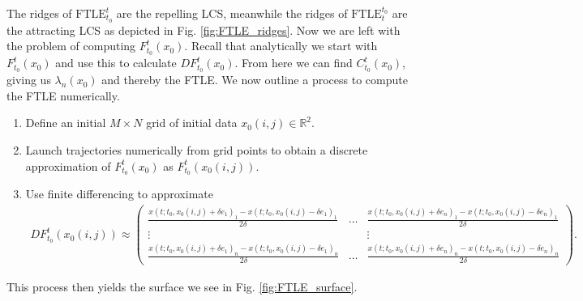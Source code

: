 The ridges of $ \textrm{FTLE} _{t_0}^{t}$ are the repelling LCS, meanwhile the ridges of $ \textrm{FTLE} _{t}^{t_0}$ are the attracting LCS as depicted in Fig. \ref{fig:FTLE_ridges}. Now we are left with the problem of computing $F_{t_0}^{t}( {x}_0)$. Recall that analytically we start with $F_{t_0}^{t}( {x}_0)$ and use this to calculate $DF_{t_0}^{t}( {x}_0)$. From here we can find $C_{t_0}^{t}( {x}_0)$, giving us $\lambda_n( {x}_0)$ and thereby the FTLE. We now outline a process to compute the FTLE numerically.
\begin{enumerate}
	\item Define an initial $M\times N$ grid of initial data $ {x}_0(i,j) \in \mathbb{R}^2$.
	\item Launch trajectories numerically from grid points to obtain a discrete approximation of $F_{t_0}^{t}( {x}_0)$ as $F_{t_0}^{t}( {x}_0(i,j))$.
	\item Use finite differencing to approximate 
		\begin{align}
			DF_{t_0}^{t}( {x}_0(i,j)) \approx
		\begin{pmatrix}
			\frac{x(t; t_0, x_0(i,j) + \delta e_1)_1 - x(t; t_0, x_{0}(i,j) - \delta e_1)_1}{2\delta} &
			\ldots &
			\frac{x(t; t_0, x_0(i,j) + \delta e_n)_1 - x(t; t_0, x_{0}(i,j) - \delta e_n)_1}{2\delta}\\
			\vdots & & \vdots \\
			\frac{x(t; t_0, x_0(i,j) + \delta e_1)_n - x(t; t_0, x_{0}(i,j) - \delta e_1)_n}{2\delta} &
			\ldots &
			\frac{x(t; t_0, x_0(i,j) + \delta e_n)_n - x(t; t_0, x_{0}(i,j) - \delta e_n)_n}{2\delta} 
		\end{pmatrix}
		.
		\end{align}
		
\end{enumerate}
This process then yields the surface we see in Fig. \ref{fig:FTLE_surface}.

